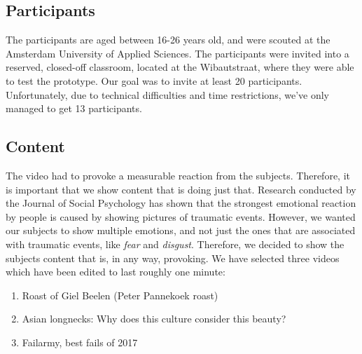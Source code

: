\documentclass[sigconf]{acmart}
\begin{document}
\subsection{Participants}
The participants are aged between 16-26 years old, and were scouted at the Amsterdam University of Applied
Sciences. The participants were invited into a reserved, closed-off classroom, located at the Wibautstraat, where
they were able to test the prototype. Our goal was to invite at least 20 participants. Unfortunately, due to
technical difficulties and time restrictions, we've only managed to get 13 participants.

\subsection{Content}
The video had to provoke a measurable reaction from the subjects. Therefore, it is important that we show content
that is doing just that. Research conducted by the Journal of Social Psychology \cite{leary2015seemingly}
has shown that the strongest emotional reaction by people is caused by showing pictures of traumatic events.
However, we wanted our subjects to show multiple emotions, and not just the ones that are associated with
traumatic events, like \emph{fear} and \emph{disgust}. Therefore, we decided to show the subjects content
that is, in any way, provoking. We have selected three videos which have been edited to last roughly one minute:
\begin{enumerate}
    \item{Roast of Giel Beelen (Peter Pannekoek roast)}
    \item{Asian longnecks: Why does this culture consider this beauty?}
    \item{Failarmy, best fails of 2017}
\end{enumerate}
\end{document}
